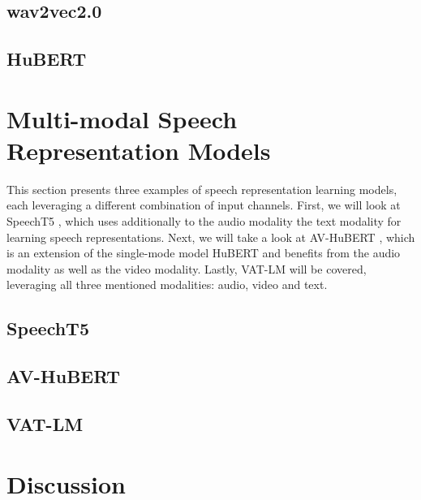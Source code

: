 \documentclass[11pt]{article}
\begin{document}
\subsection{wav2vec2.0}

\subsection{HuBERT}\label{sec:HuBERT}


\section{Multi-modal Speech Representation Models}
This section presents three examples of speech representation learning models, each leveraging a different combination of input channels. First, we will look at SpeechT5 \cite{speecht5}, which uses additionally to the audio modality the text modality for learning speech representations. Next, we will take a look at AV-HuBERT \cite{AV_HuBERT}, which is an extension of the single-mode model HuBERT \cite{hubert} and benefits from the audio modality as well as the video modality. Lastly, VAT-LM \cite{vatlm} will be covered, leveraging all three mentioned modalities: audio, video and text.
\subsection{SpeechT5}\label{sec:speecht5}

\subsection{AV-HuBERT}\label{sec:av-hubert}

\subsection{VAT-LM}

\section{Discussion}




\end{document}
